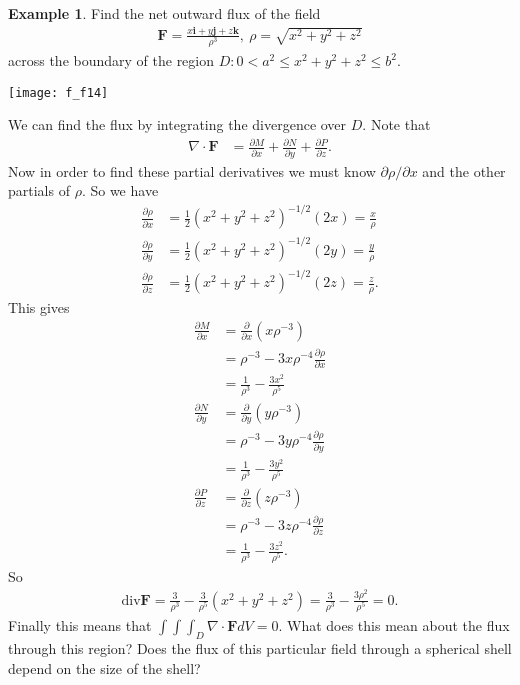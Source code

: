 \documentclass[12pt, letter]{article}
\theoremstyle{plain}
\numberwithin{theorem}{section}
\theoremstyle{definition}
\newtheorem{example}[theorem]{Example}
\begin{document}
\begin{example}
Find the net outward flux of the field
\begin{align*}
\bm{F}=\frac{x\bm{i}+y\bm{j}+z\bm{k}}{\rho^3}, \ \rho=\sqrt{x^2+y^2+z^2}
\end{align*}
across the boundary of the region $D: 0<a^2 \leq x^2+y^2+z^2 \leq b^2$.

\bigskip

\begin{center}
\texttt{[image: f\_f14]}
\end{center}

\bigskip

We can find the flux by integrating the divergence over $D$. Note that
\begin{align*}
\nabla \cdot \bm{F} &= \frac{\partial M}{\partial x} + \frac{\partial N}{\partial y} +\frac{\partial P}{\partial z}.
\end{align*}
Now in order to find these partial derivatives we must know $\partial \rho/ \partial x$ and the other partials of $\rho$. So we have
\begin{align*}
\frac{\partial \rho}{\partial x} &= \frac{1}{2}(x^2+y^2+z^2)^{-1/2}(2x) = \frac{x}{\rho}\\
\frac{\partial \rho}{\partial y} &= \frac{1}{2}(x^2+y^2+z^2)^{-1/2}(2y) = \frac{y}{\rho}\\
\frac{\partial \rho}{\partial z} &= \frac{1}{2}(x^2+y^2+z^2)^{-1/2}(2z) = \frac{z}{\rho}.
\end{align*}
This gives
\begin{align*}
\frac{\partial M}{\partial x} &= \frac{\partial}{\partial x}(x\rho^{-3})\\
&= \rho^{-3}-3x\rho^{-4}\frac{\partial \rho}{\partial x}\\
&= \frac{1}{\rho^3}-\frac{3x^2}{\rho^5}\\
\frac{\partial N}{\partial y} &= \frac{\partial}{\partial y}(y\rho^{-3})\\
&= \rho^{-3}-3y\rho^{-4}\frac{\partial \rho}{\partial y}\\
&= \frac{1}{\rho^3}-\frac{3y^2}{\rho^5}\\
\frac{\partial P}{\partial z} &= \frac{\partial}{\partial z}(z\rho^{-3})\\
&= \rho^{-3}-3z\rho^{-4}\frac{\partial \rho}{\partial z}\\
&= \frac{1}{\rho^3}-\frac{3z^2}{\rho^5}.
\end{align*}
So
\begin{align*}
\text{div}\bm{F} = \frac{3}{\rho^3}-\frac{3}{\rho^5}(x^2+y^2+z^2) = \frac{3}{\rho^3}-\frac{3\rho^2}{\rho^5} = 0.
\end{align*}
Finally this means that $\int\int\int_D \nabla \cdot \bm{F}dV = 0$. What does this mean about the flux through this region? Does the flux of this particular field through a spherical shell depend on the size of the shell?
\end{example}
\end{document}
